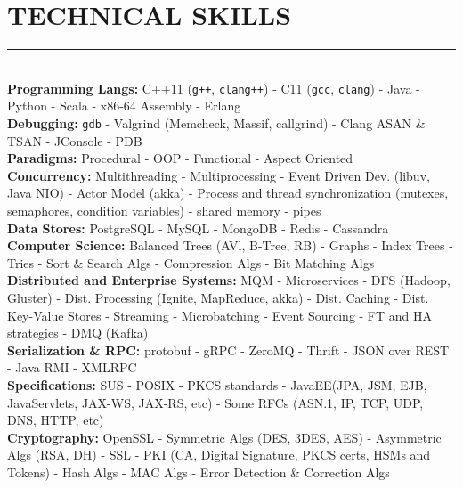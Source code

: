 \documentclass[10pt,a4paper]{article}
\begin{document}
\section{TECHNICAL SKILLS}
\noindent \rule {18.0cm}{0.2pt} \\
\noindent
\textbullet \hspace{0.1cm}\textbf{Programming Langs:} C++11 (\texttt{g++}, \texttt{clang++}) - C11 (\texttt{gcc}, \texttt{clang}) - Java - Python - Scala - x86-64 Assembly - Erlang \\
\textbullet \hspace{0.1cm}\textbf{Debugging:} \texttt{gdb} - Valgrind (Memcheck, Massif, callgrind) - Clang ASAN \& TSAN - JConsole - PDB \\
\textbullet \hspace{0.1cm}\textbf{Paradigms:} Procedural - OOP - Functional - Aspect Oriented\\
\textbullet \hspace{0.1cm}\textbf{Concurrency:} Multithreading - Multiprocessing - Event Driven Dev. (libuv, Java NIO) - Actor Model (akka) - Process and thread synchronization (mutexes, semaphores, condition variables) - shared memory - pipes \\
\textbullet \hspace{0.1cm}\textbf{Data Stores:} PostgreSQL - MySQL - MongoDB - Redis - Cassandra \\
\textbullet \hspace{0.1cm}\textbf{Computer Science:} Balanced Trees (AVl, B-Tree, RB) - Graphs - Index Trees - Tries - Sort \& Search Algs - Compression Algs - Bit Matching Algs  \\
\textbullet \hspace{0.1cm}\textbf{Distributed and Enterprise Systems:} MQM - Microservices - DFS (Hadoop, Gluster) - Dist. Processing (Ignite, MapReduce, akka) - Dist. Caching - Dist. Key-Value Stores - Streaming - Microbatching - Event Sourcing - FT and HA strategies - DMQ (Kafka)  \\
\textbullet \hspace{0.1cm}\textbf{Serialization \& RPC:} protobuf - gRPC - ZeroMQ - Thrift - JSON over REST - Java RMI - XMLRPC \\
\textbullet \hspace{0.1cm}\textbf{Specifications:} SUS - POSIX - PKCS standards - JavaEE(JPA, JSM, EJB, JavaServlets, JAX-WS, JAX-RS, etc) - Some RFCs (ASN.1, IP, TCP, UDP, DNS, HTTP, etc) \\
\textbullet \hspace{0.1cm}\textbf{Cryptography:} OpenSSL - Symmetric Algs (DES, 3DES, AES) - Asymmetric Algs (RSA, DH) - SSL - PKI (CA, Digital Signature, PKCS certs, HSMs and Tokens) - Hash Algs - MAC Algs - Error Detection \& Correction Algs \\ 
\end{document}
